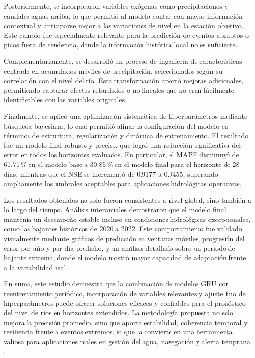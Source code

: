 Posteriormente, se incorporaron variables exógenas como precipitaciones y caudales aguas arriba, lo que permitió al modelo contar con mayor información contextual y anticiparse mejor a las variaciones de nivel en la estación objetivo. Este cambio fue especialmente relevante para la predicción de eventos abruptos o picos fuera de tendencia, donde la información histórica local no es suficiente.

Complementariamente, se desarrolló un proceso de ingeniería de características centrado en acumulados móviles de precipitación, seleccionados según su correlación con el nivel del río. Esta transformación aportó mejoras adicionales, permitiendo capturar efectos retardados o no lineales que no eran fácilmente identificables con las variables originales.

Finalmente, se aplicó una optimización sistemática de hiperparámetros mediante búsqueda bayesiana, lo cual permitió afinar la configuración del modelo en términos de estructura, regularización y dinámica de entrenamiento. El resultado fue un modelo final robusto y preciso, que logró una reducción significativa del error en todos los horizontes evaluados. En particular, el MAPE disminuyó de 61.71\,\% en el modelo base a 30.85\,\% en el modelo final para el horizonte de 28 días, mientras que el NSE se incrementó de 0.9177 a 0.9455, superando ampliamente los umbrales aceptables para aplicaciones hidrológicas operativas.

Los resultados obtenidos no solo fueron consistentes a nivel global, sino también a lo largo del tiempo. Análisis interanuales demostraron que el modelo final mantenía un desempeño estable incluso en condiciones hidrológicas excepcionales, como las bajantes históricas de 2020 a 2022. Este comportamiento fue validado visualmente mediante gráficos de predicción en ventanas móviles, progresión del error por año y por día predicho, y un análisis detallado sobre un periodo de bajante extrema, donde el modelo mostró mayor capacidad de adaptación frente a la variabilidad real.

En suma, este estudio demuestra que la combinación de modelos GRU con reentrenamiento periódico, incorporación de variables relevantes y ajuste fino de hiperparámetros puede ofrecer soluciones eficaces y confiables para el pronóstico del nivel de ríos en horizontes extendidos. La metodología propuesta no solo mejora la precisión promedio, sino que aporta estabilidad, coherencia temporal y resiliencia frente a eventos extremos, lo que la convierte en una herramienta valiosa para aplicaciones reales en gestión del agua, navegación y alerta temprana \cite{zzzzgiuli2025tesiscode} \cite{zzzzzgiuli2025cleicode}.



